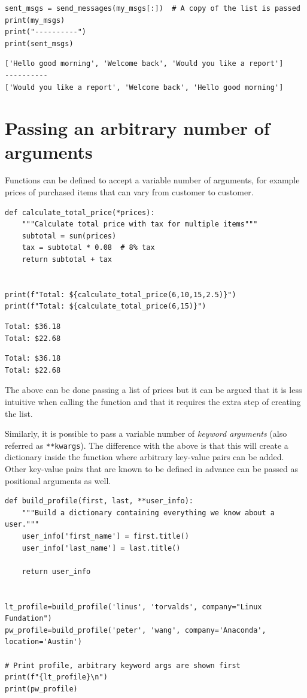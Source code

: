 \documentclass[10pt]{book}
\begin{document}
\begin{enumerate}
\begin{verbatim}
sent_msgs = send_messages(my_msgs[:])  # A copy of the list is passed
print(my_msgs)
print("----------")
print(sent_msgs)
\end{verbatim}

\label{org3dc756d}
\begin{verbatim}
['Hello good morning', 'Welcome back', 'Would you like a report']
----------
['Would you like a report', 'Welcome back', 'Hello good morning']
\end{verbatim}
\end{enumerate}
\section{Passing an arbitrary number of arguments}
\label{sec:orgae61f8f}
Functions can be defined to accept a variable number of arguments, for example prices of purchased items that can vary from customer to customer.
\label{org842fdab}
\begin{verbatim}
def calculate_total_price(*prices):
    """Calculate total price with tax for multiple items"""
    subtotal = sum(prices)
    tax = subtotal * 0.08  # 8% tax
    return subtotal + tax


print(f"Total: ${calculate_total_price(6,10,15,2.5)}")
print(f"Total: ${calculate_total_price(6,15)}")
\end{verbatim}

\label{orga9a3d63}
\begin{verbatim}
Total: $36.18
Total: $22.68
\end{verbatim}

\label{org414bc4c}
\begin{verbatim}
Total: $36.18
Total: $22.68
\end{verbatim}

The above can be done passing a list of prices but it can be argued that it is less intuitive when calling the function and that it requires the extra step of creating the list.

Similarly, it is possible to pass a variable number of \emph{keyword arguments} (also referred as \texttt{**kwargs}). The difference with the above is that this will create a dictionary inside the function where arbitrary key-value pairs can be added. Other key-value pairs that are known to be defined in advance can be passed as positional arguments as well.

\label{org488a402}
\begin{verbatim}
def build_profile(first, last, **user_info):
    """Build a dictionary containing everything we know about a user."""
    user_info['first_name'] = first.title()
    user_info['last_name'] = last.title()

    return user_info


lt_profile=build_profile('linus', 'torvalds', company="Linux Fundation")
pw_profile=build_profile('peter', 'wang', company='Anaconda', location='Austin')

# Print profile, arbitrary keyword args are shown first
print(f"{lt_profile}\n")
print(pw_profile)
\end{verbatim}
\end{document}
